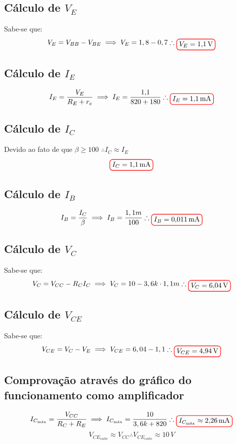 \documentclass[12pt,openany,oneside,a4paper]{abntex2}
\begin{document}
\subsection{Cálculo de $V_{E}$}
Sabe-se que:
\[
V_{E} = V_{BB} - V_{BE} \implies V_{E} = 1,8 - 0,7 \therefore \tikz[baseline]{\node[draw=red, thick, rounded corners] {$V_{E} = 1{,}1\,\text{V}$};}
\]

\subsection{Cálculo de $I_{E}$}
\[
I_E = \frac{V_E}{R_E + r_e} \implies I_E = \frac{1{,}1}{820 + 180}  \therefore \tikz[baseline]{\node[draw=red, thick, rounded corners] {$I_E = 1{,}1\,\text{mA}$};}
\]

\subsection{Cálculo de $I_{C}$}
Devido ao fato de que $\beta \geq 100$ $\therefore I_C \approx I_E$
\[
\tikz[baseline]{\node[draw=red, thick, rounded corners] {$I_{C} = 1{,}1\,\text{mA}$};}
\]

\subsection{Cálculo de $I_{B}$}
\[
I_{B} = \frac {I_{C}} \beta \implies I_{B} = \frac {1,1m} {100} \therefore \tikz[baseline]{\node[draw=red, thick, rounded corners] {$I_{B} = 0{,}011\,\text{mA}$};}
\]

\subsection{Cálculo de $V_{C}$}
Sabe-se que:
\[
V_{C} = V_{CC} - R_{C} I_{C} \implies V_{C} = 10 - 3,6k \cdot 1,1m \therefore \tikz[baseline]{\node[draw=red, thick, rounded corners] {$V_{C} = 6{,}04\,\text{V}$};}
\]

\subsection{Cálculo de $V_{CE}$}
Sabe-se que:
\[
V_{CE} = V_{C} - V_{E} \implies V_{CE} = 6,04 - 1,1 \therefore \tikz[baseline]{\node[draw=red, thick, rounded corners] {$V_{CE} = 4{,}94\,\text{V}$};}
\]

\subsection{Comprovação através do gráfico do funcionamento como amplificador}
\[
I_{C_{\text{máx}}} = \frac {V_{CC}}{R_{C} + R_{E}} \implies I_{C_{\text{máx}}} = \frac {10}{3,6k + 820} \therefore \tikz[baseline]{\node[draw=red, thick, rounded corners] {$I_{C_{\text{máx}}} \approx 2{,}26\,\text{mA}$};}
\]
\[
V_{CE_{\text{corte}}} \approx V_{CC} \therefore V_{CE_{\text{corte}}} \approx 10\,V
\]
\end{document}
